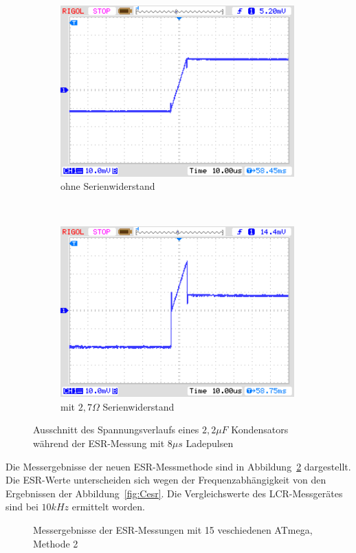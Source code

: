 \begin{figure}[H]
  \begin{subfigure}[b]{9cm}
    \centering
    \includegraphics[width=9cm]{../PNG/NewEsr2u2F0R0zoom.png}
    \caption{ohne Serienwiderstand}
  \end{subfigure}
  ~
  \begin{subfigure}[b]{9cm}
    \centering
    \includegraphics[width=9cm]{../PNG/NewEsr2u2F2R7zoom.png}
    \caption{mit \(2,7\Omega\) Serienwiderstand}
  \end{subfigure}
  \caption{Ausschnitt des Spannungsverlaufs eines \(2,2\mu F\) Kondensators während der ESR-Messung mit \(8\mu s\) Ladepulsen}
  \label{pic:NewEsr2zoom}
\end{figure}
 

Die Messergebnisse der neuen ESR-Messmethode sind in Abbildung~\ref{fig:Cesr2} dargestellt.
Die ESR-Werte unterscheiden sich wegen der Frequenzabhängigkeit von den Ergebnissen der Abbildung~\ref{fig:Cesr}.
Die Vergleichswerte des LCR-Messgerätes sind bei \(10kHz\) ermittelt worden.

\begin{figure}[H]
\centering

\caption{Messergebnisse der ESR-Messungen mit 15 veschiedenen ATmega, Methode 2}
\label{fig:Cesr2}
\end{figure}

